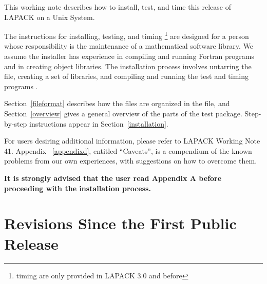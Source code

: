 \documentclass[11pt]{report}
\begin{document}
This working note describes how to install, test, and time this
release of LAPACK on a Unix System.

The instructions for installing, testing, and timing 
\footnote{timing are only provided in LAPACK 3.0 and before} 
are designed for a person whose
responsibility is the maintenance of a mathematical software library.
We assume the installer has experience in compiling and running 
Fortran programs and in creating object libraries.
The installation process involves untarring the file, creating a set of
libraries, and compiling and running the test and timing programs 
\footnotemark[\value{footnote}]. 


Section~\ref{fileformat} describes how the files are organized in the
file, and
Section~\ref{overview} gives a general overview of the parts of the test package.
Step-by-step instructions appear in Section~\ref{installation}.

For users desiring additional information, please refer to LAPACK
Working Note 41.
Appendix ~\ref{appendixd}, entitled ``Caveats'', is a compendium of the known 
problems from our own experiences, with suggestions on how to 
overcome them.

\textbf{It is strongly advised that the user read Appendix
A before proceeding with the installation process.}

\section{Revisions Since the First Public Release}
\end{document}
